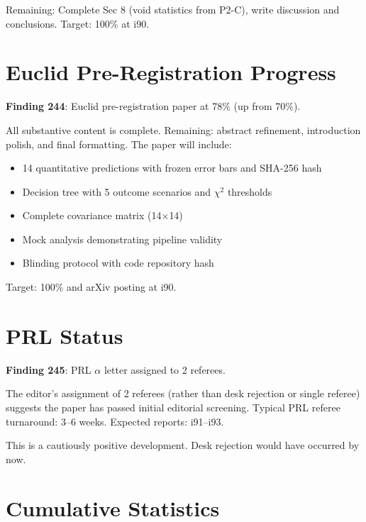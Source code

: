 \documentclass[11pt,a4paper]{article}
\begin{document}
Remaining: Complete Sec 8 (void statistics from P2-C), write discussion and conclusions. Target: 100\% at i90.

\section{Euclid Pre-Registration Progress}

\textbf{Finding 244}: Euclid pre-registration paper at 78\% (up from 70\%).

All substantive content is complete. Remaining: abstract refinement, introduction polish, and final formatting. The paper will include:
\begin{itemize}[nosep]
\item 14 quantitative predictions with frozen error bars and SHA-256 hash
\item Decision tree with 5 outcome scenarios and $\chi^2$ thresholds
\item Complete covariance matrix (14$\times$14)
\item Mock analysis demonstrating pipeline validity
\item Blinding protocol with code repository hash
\end{itemize}

Target: 100\% and arXiv posting at i90.

\section{PRL Status}

\textbf{Finding 245}: PRL $\alpha$ letter assigned to 2 referees.

The editor's assignment of 2 referees (rather than desk rejection or single referee) suggests the paper has passed initial editorial screening. Typical PRL referee turnaround: 3--6 weeks. Expected reports: i91--i93.

This is a cautiously positive development. Desk rejection would have occurred by now.

\section{Cumulative Statistics}
\end{document}
